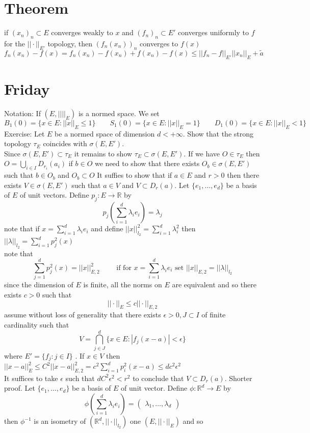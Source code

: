 \documentclass[11pt]{article}
\begin{document}
\section{Theorem}
if $(x_n)_n \subset E$ converges weakly to $x$ and  $(f_n)_n \subset E'$ converges uniformly to $f$ for the
$||\cdot||_{E'}$ topology, then  $(f_n(x_n))_n$ converges to  $f(x)$
 \[
     f_n(x_n) - f(x) = f_n(x_n) - f(x_n) + f(x_n) - f(x)  \le ||f_n - f||_{E'} ||x_n||_{E} + \tilde a
\] 

\section{Friday}
Notation: If $(E, || ||_E)$ is a normed space.
We set
\[
    B_1(0)  = \{x \in E : ||x||_E \le 1\} \qquad S_1(0) = \{x \in E: ||x||_E = 1\}\qquad  D_1(0) = \{x \in E: ||x||_E < 1\}
\] 
Exercise: Let $E$ be a normed space of dimension  $d < +\infty$. Show that the strong
topology $\tau_E$ coincides with  $\sigma(E, E')$.\\
Since  $\sigma(E, E') \subset \tau_E$ it remains to show $\tau_E \subset \sigma(E, E')$.
If we have $O \in \tau_E$ then  $O = \bigcup_{i \in I} D_{r_i}(a_i)$ if  $b \in O$ we need to show that there exists  $O_b \in \sigma(E, E')$ such that $b \in O_b$ and  $O_b \subset O$
It suffies to show that if $a \in E$ and  $r > 0$ then there exists  $V \in \sigma(E, E')$ such that $a \in V$ and  $V \subset D_r(a)$.
Let $\{e_1,\dots,e_d\}$ be a basis of $E$ of unit vectors. Define $p_j : E \rightarrow \mathbb{R}$ by 
\[
p_j (\sum_{i=1}^{d} \lambda_i e_i) = \lambda_j
\] 
note that if $x = \sum_{i=1}^{d}\lambda_i e_i$ and define $||x||_{l_2}^2 = \sum_{i=1}^{d}\lambda_i^2$ then $|| \lambda||_{l_2} = \sum_{i=1}^{d}p_j^2(x)$\\
note that
\[
    \sum_{j=1}^{d}p_j^2(x) = ||x||_{E,2}^2 \qquad \text{ if for $x = \sum_{i=1}^{d}\lambda_i e_i$ set $||x||_{E,2} = ||\lambda||_{l_2}$}
\] 
since the dimension of $E$ is finite, all the norms on $E$ are equivalent and so there exists $c > 0$ such that
 \[
     ||\cdot||_E \le c ||\cdot||_{E,2}
\] 
assume without loss of generality that there exists $\epsilon > 0, J \subset I$ of finite cardinality such that
\[
    V = \bigcap_{j \in J}^{d} \{x \in E: |f_j(x-a)| < \epsilon\} 
\] 
where $E' = \{f_j : j \in I\}$ .
If $x \in V$ then  $||x-a||_{E}^2 \le C^2 ||x-a||_{E,2}^2 = c^2 \sum_{i=1}^{d}p_i^2(x-a) \le dc^2 \epsilon^2$ \\
It suffices to take $\epsilon$ such that $dC^2 \epsilon^2 < r^2$ to conclude that $V \subset D_r(a)$.
Shorter proof. Let $\{e_1,\dots,e_d\}$ be a basis of $E$ of unit vector. Define  $\phi : \mathbb{R}^{d} \to E$ by
\[
\phi(\sum_{i=1}^{d}\lambda_i e_i) = \begin{pmatrix} \lambda_1,\dots,\lambda_d \end{pmatrix} 
\] 
then $\phi^{-1}$ is an isometry of $( \mathbb{R}^{d}, || \cdot ||_{l_2})$ one $(E , ||\cdot||_E)$ and so\\
\end{document}
